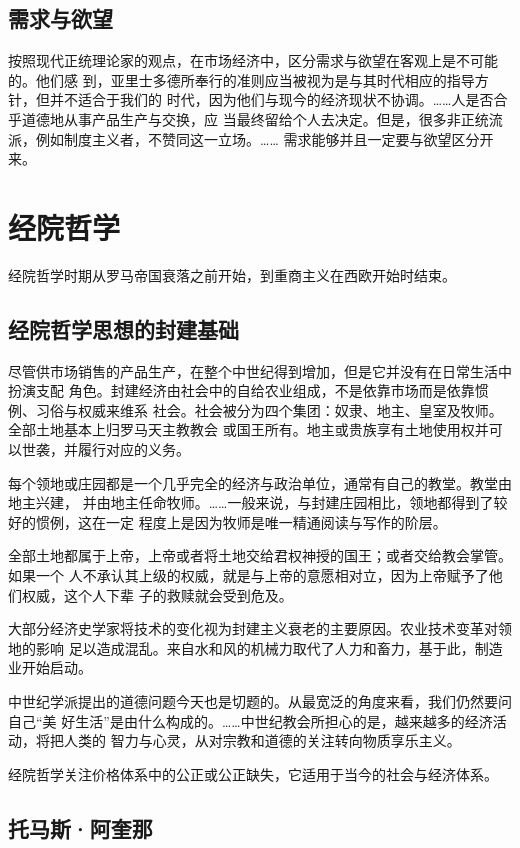 \subsection{需求与欲望}

按照现代正统理论家的观点，在市场经济中，区分需求与欲望在客观上是不可能的。他们感
到，亚里士多德所奉行的准则应当被视为是与其时代相应的指导方针，但并不适合于我们的
时代，因为他们与现今的经济现状不协调。……人是否合乎道德地从事产品生产与交换，应
当最终留给个人去决定。但是，很多非正统流派，例如制度主义者，不赞同这一立场。……
需求能够并且一定要与欲望区分开来。

\section{经院哲学}

经院哲学时期从罗马帝国衰落之前开始，到重商主义在西欧开始时结束。

\subsection{经院哲学思想的封建基础}

尽管供市场销售的产品生产，在整个中世纪得到增加，但是它并没有在日常生活中扮演支配
角色。封建经济由社会中的自给农业组成，不是依靠市场而是依靠惯例、习俗与权威来维系
社会。社会被分为四个集团：奴隶、地主、皇室及牧师。全部土地基本上归罗马天主教教会
或国王所有。地主或贵族享有土地使用权并可以世袭，并履行对应的义务。

每个领地或庄园都是一个几乎完全的经济与政治单位，通常有自己的教堂。教堂由地主兴建，
并由地主任命牧师。……一般来说，与封建庄园相比，领地都得到了较好的惯例，这在一定
程度上是因为牧师是唯一精通阅读与写作的阶层。

全部土地都属于上帝，上帝或者将土地交给君权神授的国王；或者交给教会掌管。如果一个
人不承认其上级的权威，就是与上帝的意愿相对立，因为上帝赋予了他们权威，这个人下辈
子的救赎就会受到危及。

大部分经济史学家将技术的变化视为封建主义衰老的主要原因。农业技术变革对领地的影响
足以造成混乱。来自水和风的机械力取代了人力和畜力，基于此，制造业开始启动。

中世纪学派提出的道德问题今天也是切题的。从最宽泛的角度来看，我们仍然要问自己“美
好生活”是由什么构成的。……中世纪教会所担心的是，越来越多的经济活动，将把人类的
智力与心灵，从对宗教和道德的关注转向物质享乐主义。

经院哲学关注价格体系中的公正或公正缺失，它适用于当今的社会与经济体系。

\subsection{托马斯·阿奎那}

